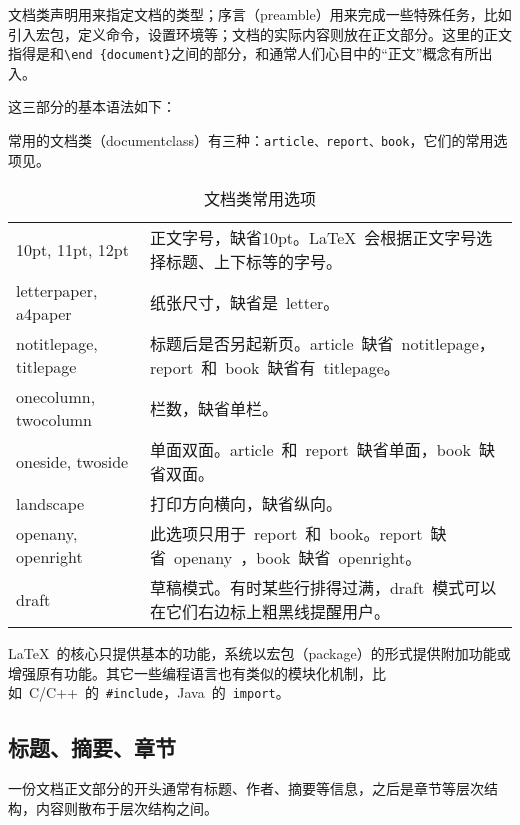 文档类声明用来指定文档的类型；序言（preamble）用来完成一些特殊任务，比如引入宏包，定义命令，设置环境等；文档的实际内容则放在正文部分。这里的正文指得是\verb||和\verb|\end|~\verb|{document}|之间的部分，和通常人们心目中的“正文”概念有所出入。

这三部分的基本语法如下：

常用的文档类（documentclass）有三种：\verb|article、report、book|，它们的常用选项见。

\begin{table}[htbp]
\centering
\caption{文档类常用选项}
\label{tab:class_options}
\begin{tabularx}{350pt}{lX}
    \toprule
    10pt, 11pt, 12pt & 正文字号，缺省10pt。\LaTeX~会根据正文字号选择标题、上下标等的字号。\\
    letterpaper, a4paper & 纸张尺寸，缺省是~letter。\\
    notitlepage, titlepage & 标题后是否另起新页。article~缺省~notitlepage，report~和~book~缺省有~titlepage。\\
    onecolumn, twocolumn & 栏数，缺省单栏。\\
    oneside, twoside & 单面双面。article~和~report~缺省单面，book~缺省双面。\\
    landscape & 打印方向横向，缺省纵向。\\
    openany, openright & 此选项只用于~report~和~book。report~缺省~openany~，book~缺省~openright。\\
    draft & 草稿模式。有时某些行排得过满，draft~模式可以在它们右边标上粗黑线提醒用户。\\
    \bottomrule
\end{tabularx}
\end{table}

\LaTeX~的核心只提供基本的功能，系统以宏包（package）的形式提供附加功能或增强原有功能。其它一些编程语言也有类似的模块化机制，比如~C/C++~的~\verb|#include|，Java~的~\verb|import|。

\subsection{标题、摘要、章节}


一份文档正文部分的开头通常有标题、作者、摘要等信息，之后是章节等层次结构，内容则散布于层次结构之间。

